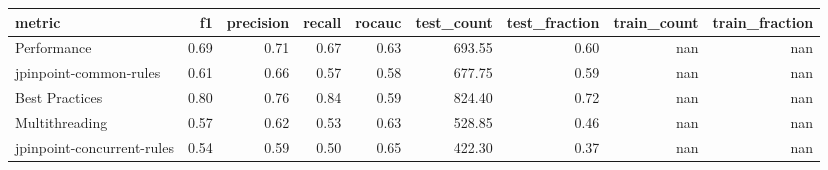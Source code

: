 \begin{tabular}{lrrrrrrrr}
\toprule
metric &   f1 &  precision &  recall &  rocauc &  test\_count &  test\_fraction &  train\_count &  train\_fraction \\
\midrule
Performance                & 0.69 &       0.71 &    0.67 &    0.63 &      693.55 &           0.60 &          nan &             nan \\
jpinpoint-common-rules     & 0.61 &       0.66 &    0.57 &    0.58 &      677.75 &           0.59 &          nan &             nan \\
Best Practices             & 0.80 &       0.76 &    0.84 &    0.59 &      824.40 &           0.72 &          nan &             nan \\
Multithreading             & 0.57 &       0.62 &    0.53 &    0.63 &      528.85 &           0.46 &          nan &             nan \\
jpinpoint-concurrent-rules & 0.54 &       0.59 &    0.50 &    0.65 &      422.30 &           0.37 &          nan &             nan \\
\bottomrule
\end{tabular}
